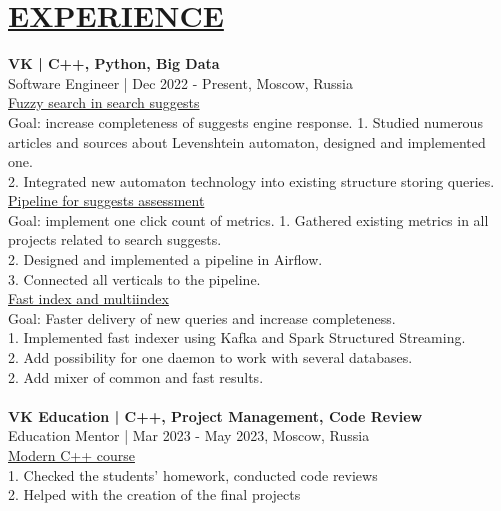 \documentclass{resume} %
\begin{document}
\section*{\uline{EXPERIENCE \hfill}}
\textbf{VK | C++, Python, Big Data} \\
Software Engineer | Dec 2022 - Present, Moscow, Russia \\
\uline{Fuzzy search in search suggests}\\
Goal: increase completeness of suggests engine response.
1. Studied numerous articles and sources about Levenshtein automaton, designed and implemented one.\\
2. Integrated new automaton technology into existing structure storing queries.\\
\uline{Pipeline for suggests assessment}\\
Goal: implement one click count of metrics.
1. Gathered existing metrics in all projects related to search suggests.\\
2. Designed and implemented a pipeline in Airflow.\\
3. Connected all verticals to the pipeline.\\
\uline{Fast index and multiindex}\\
Goal: Faster delivery of new queries and increase completeness.\\
1. Implemented fast indexer using Kafka and Spark Structured Streaming.\\
2. Add possibility for one daemon to work with several databases.\\
2. Add mixer of common and fast results.\\
\\
\textbf{VK Education | C++, Project Management, Code Review}\\
Education Mentor | Mar 2023 - May 2023, Moscow, Russia\\
\uline{Modern C++ course}\\
1. Checked the students' homework, conducted code reviews\\
2. Helped with the creation of the final projects\\
\end{document}
